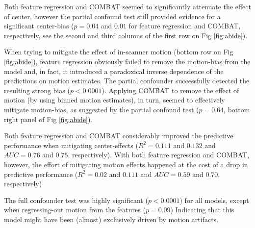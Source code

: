 \documentclass{article}
\begin{document}
Both feature regression and COMBAT seemed to significantly attenuate the effect of center, however the partial confound test still provided evidence for a significant center-bias ($p=0.04$ and $0.01$ for feature regression and COMBAT, respectively, see the second and third columns of the first row on Fig \ref{fig:abide}). 

When trying to mitigate the effect of in-scanner motion (bottom row on Fig \ref{fig:abide}), feature regression obviously failed to remove the motion-bias from the model and, in fact, it introduced a paradoxical inverse dependence of the predictions on motion estimates. The partial confounder successfully detected the resulting strong bias ($p<0.0001$). Applying COMBAT to remove the effect of motion (by using binned motion estimates), in turn, seemed to effectively mitigate motion-bias, as suggested by the partial confound test ($p=0.64$, bottom right panel of Fig \ref{fig:abide}).

Both feature regression and COMBAT considerably improved the predictive performance when mitigating center-effects ($R^2=0.111$ and $0.132$ and $AUC=0.76$ and $0.75$, respectively). With both feature regression and COMBAT, however, the effort of mitigating motion effects happened at the cost of a drop in predictive performance ($R^2=0.02$ and $0.111$ and $AUC=0.59$ and $0.70$, respectively)

The full confounder test was highly significant ($p<0.0001$) for all models, except when regressing-out motion from the features ($p=0.09$) Indicating that this model might have been (almost) exclusively driven by motion artifacts.
\end{document}
